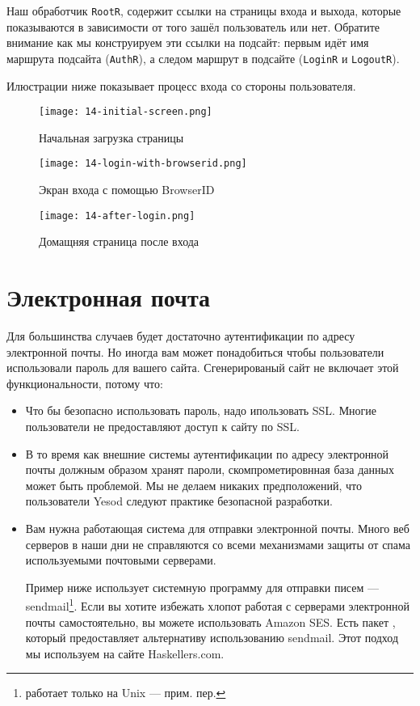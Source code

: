 Наш обработчик \lstinline'RootR', содержит ссылки на страницы входа и выхода, которые показываются в зависимости от того зашёл пользователь или нет. Обратите внимание как мы конструируем эти ссылки на подсайт: первым идёт имя маршрута подсайта (\lstinline'AuthR'), а следом маршрут в подсайте (\lstinline'LoginR' и \lstinline'LogoutR').

Илюстрации ниже показывает процесс входа со стороны пользователя.

\begin{figure}[tbh]
  \centering
  \texttt{[image: 14-initial-screen.png]}
  \caption{Начальная загрузка страницы}
\end{figure}

\begin{figure}[tbh]
  \centering
  \texttt{[image: 14-login-with-browserid.png]}
  \caption{Экран входа с помощью BrowserID}
\end{figure}

\begin{figure}[tbh]
  \centering
  \texttt{[image: 14-after-login.png]}
  \caption{Домащняя страница после входа}
\end{figure}

\section{Электронная почта}

Для большинства случаев будет достаточно аутентификации по адресу электронной почты. Но иногда вам может понадобиться чтобы пользователи использовали пароль для вашего сайта. Сгенерированый сайт не включает этой функциональности, потому что:

\begin{itemize}
    \item Что бы безопасно использовать пароль, надо ипользовать SSL. Многие пользователи не предоставляют доступ к сайту по SSL.

    \item В то время как внешние системы аутентификации по адресу электронной почты должным образом хранят пароли, скомпрометировнная база данных может быть проблемой. Мы не делаем никаких предположений, что пользователи Yesod следуют практике безопасной разработки.

    \item Вам нужна работающая система для отправки электронной почты. Много веб серверов в наши дни не справляются со всеми механизмами защиты от спама используемыми почтовыми серверами.

    \begin{remark}
    Пример ниже использует системную программу для отправки писем --- sendmail\footnote{работает только на Unix --- прим. пер.}. Если вы хотите избежать хлопот работая с серверами электронной почты самостоятельно, вы можете использовать Amazon SES. Есть пакет , который предоставляет альтернативу использованию sendmail. Этот подход мы используем на сайте Haskellers.com.
    \end{remark}
\end{itemize}

